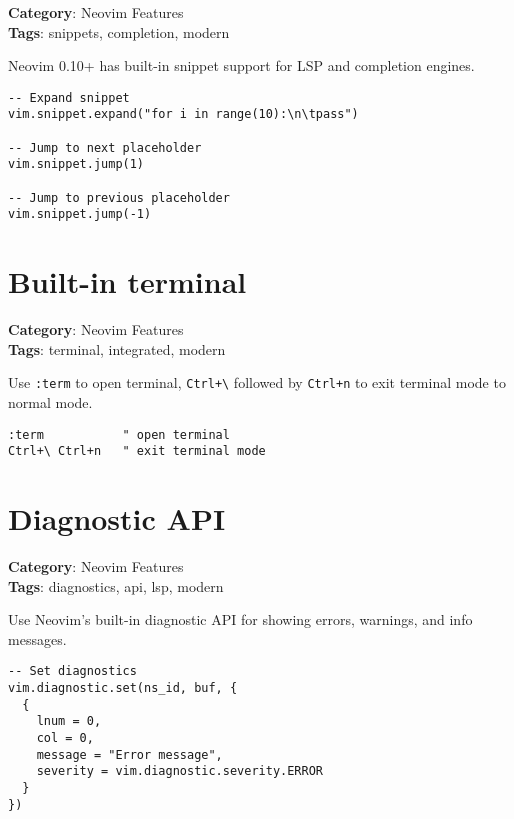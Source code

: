 {{{{{{{{{{\textbf{Category}: Neovim Features\\ \textbf{Tags}: snippets, completion, modern
\vspace{0.5cm}

Neovim 0.10+ has built-in snippet support for LSP and completion engines.

\begin{Exa*}{}
\begin{Verbatim}[fontsize=\footnotesize, breaklines, breakanywhere]
-- Expand snippet
vim.snippet.expand("for i in range(10):\n\tpass")

-- Jump to next placeholder
vim.snippet.jump(1)

-- Jump to previous placeholder
vim.snippet.jump(-1)
\end{Verbatim}
\end{Exa*}

\section{Built-in terminal}

\textbf{Category}: Neovim Features\\ \textbf{Tags}: terminal, integrated, modern
\vspace{0.5cm}

Use {\footnotesize \Verb§:term§} to open terminal, {\footnotesize \Verb§Ctrl+\§} followed by {\footnotesize \Verb§Ctrl+n§} to exit terminal mode to normal mode.

\begin{Exa*}{}
\begin{Verbatim}[fontsize=\footnotesize, breaklines, breakanywhere]
:term           " open terminal
Ctrl+\ Ctrl+n   " exit terminal mode
\end{Verbatim}
\end{Exa*}

\section{Diagnostic API}

\textbf{Category}: Neovim Features\\ \textbf{Tags}: diagnostics, api, lsp, modern
\vspace{0.5cm}

Use Neovim's built-in diagnostic API for showing errors, warnings, and info messages.

\begin{Exa*}{}
\begin{Verbatim}[fontsize=\footnotesize, breaklines, breakanywhere]
-- Set diagnostics
vim.diagnostic.set(ns_id, buf, {
  {
    lnum = 0,
    col = 0,
    message = "Error message",
    severity = vim.diagnostic.severity.ERROR
  }
})


\end{Verbatim}
\end{Exa*}}}}}}}}}}}
